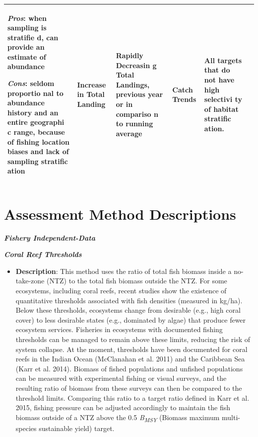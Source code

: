 \documentclass[]{book}
\providecommand{\tightlist}{%
  \setlength{\itemsep}{0pt}\setlength{\parskip}{0pt}}
\begin{document}
\begin{longtable}[]{@{}llllll@{}}
\begin{minipage}[t]{0.16\columnwidth}
\emph{Pros}: when sampling is stratifie d, can provide an estimate of
abundance

\emph{Cons}: seldom proportio nal to abundance history and an entire
geographi c range, because of fishing location biases and lack of
sampling stratific ation\strut
\end{minipage} & \begin{minipage}[t]{0.16\columnwidth}\raggedright\strut
Increase in Total Landing\strut
\end{minipage} & \begin{minipage}[t]{0.16\columnwidth}\raggedright\strut
Rapidly Decreasin g Total Landings, previous year or in compariso n to
running average\strut
\end{minipage} & \begin{minipage}[t]{0.16\columnwidth}\raggedright\strut
Catch Trends\strut
\end{minipage} & \begin{minipage}[t]{0.16\columnwidth}\raggedright\strut
All targets that do not have high selectivi ty of habitat stratific
ation.\strut
\end{minipage}\tabularnewline
\bottomrule
\end{longtable}

\section{Assessment Method
Descriptions}\label{assessment-method-descriptions}

\textbf{\emph{Fishery Independent-Data}}

\textbf{\emph{Coral Reef Thresholds}}

\begin{itemize}
\tightlist
\item
  \textbf{Description}: This method uses the ratio of total fish biomass
  inside a no-take-zone (NTZ) to the total fish biomass outside the NTZ.
  For some ecosystems, including coral reefs, recent studies show the
  existence of quantitative thresholds associated with fish densities
  (measured in kg/ha). Below these thresholds, ecosystems change from
  desirable (e.g., high coral cover) to less desirable states (e.g.,
  dominated by algae) that produce fewer ecosystem services. Fisheries
  in ecosystems with documented fishing thresholds can be managed to
  remain above these limits, reducing the risk of system collapse. At
  the moment, thresholds have been documented for coral reefs in the
  Indian Ocean (McClanahan et al. 2011) and the Caribbean Sea (Karr et
  al. 2014). Biomass of fished populations and unfished populations can
  be measured with experimental fishing or visual surveys, and the
  resulting ratio of biomass from these surveys can then be compared to
  the threshold limits. Comparing this ratio to a target ratio defined
  in Karr et al. 2015, fishing pressure can be adjusted accordingly to
  maintain the fish biomass outside of a NTZ above the 0.5
  \emph{B\textsubscript{MSY}} (Biomass maximum multi-species sustainable
  yield) target.
\end{itemize}
\end{document}
